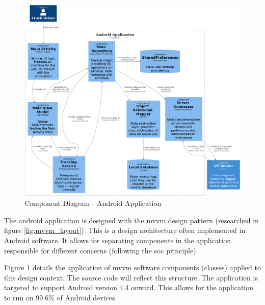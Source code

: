 \begin{figure}
\centering
\includegraphics[width=6in]{../diag/android_component.png}
\caption{Component Diagram - Android Application}
\label{fig:android_component}
\end{figure}

The android application is designed with the \ac{mvvm} design pattern (researched in figure \ref{fig:mvvm_layout}).
This is a design architecture often implemented in Android software.
It allows for separating components in the application responsible for different concerns (following the \ac{soc} principle).

Figure \ref{fig:android_component} details the application of \ac{mvvm} software components (classes) applied to this design context.
The source code will reflect this structure. 
The application is targeted to support Android version 4.4 onward.
This allows for the application to run on 99.6\% of Android devices.

